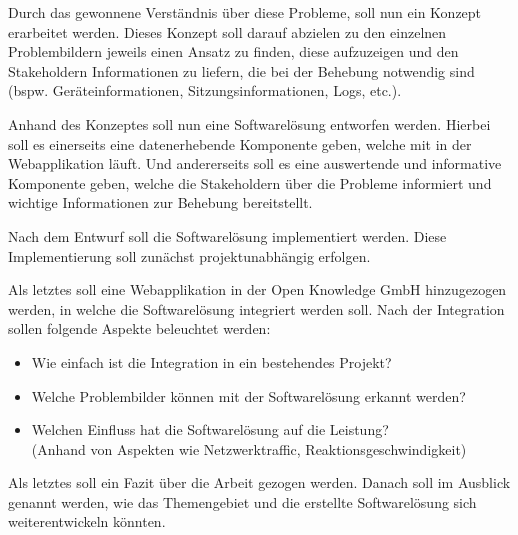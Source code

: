 Durch das gewonnene Verständnis über diese Probleme, soll nun ein Konzept erarbeitet werden. Dieses Konzept soll darauf abzielen zu den einzelnen Problembildern jeweils einen Ansatz zu finden, diese aufzuzeigen und den Stakeholdern Informationen zu liefern, die bei der Behebung notwendig sind (bspw. Geräteinformationen, Sitzungsinformationen, Logs, etc.).

Anhand des Konzeptes soll nun eine Softwarelösung entworfen werden. Hierbei soll es einerseits eine datenerhebende Komponente geben, welche mit in der Webapplikation läuft. Und andererseits soll es eine auswertende und informative Komponente geben, welche die Stakeholdern über die Probleme informiert und wichtige Informationen zur Behebung bereitstellt.

Nach dem Entwurf soll die Softwarelösung implementiert werden. Diese Implementierung soll zunächst projektunabhängig erfolgen.

Als letztes soll eine Webapplikation in der Open Knowledge GmbH hinzugezogen werden, in welche die Softwarelösung integriert werden soll. Nach der Integration sollen folgende Aspekte beleuchtet werden:

\begin{itemize}
	\item Wie einfach ist die Integration in ein bestehendes Projekt?
	\item Welche Problembilder können mit der Softwarelösung erkannt werden?
	\item Welchen Einfluss hat die Softwarelösung auf die Leistung? \\(Anhand von Aspekten wie Netzwerktraffic, Reaktionsgeschwindigkeit)
\end{itemize}

Als letztes soll ein Fazit über die Arbeit gezogen werden. Danach soll im Ausblick genannt werden, wie das Themengebiet und die erstellte Softwarelösung sich weiterentwickeln könnten.

